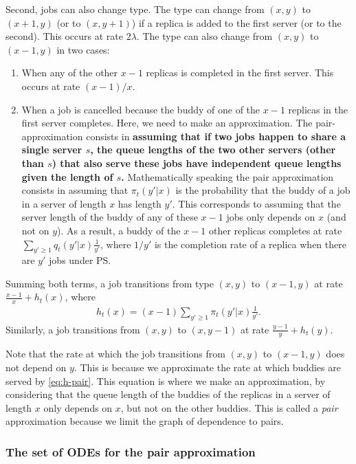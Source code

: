 \documentclass[acmsmall,nonacm]{acmart}
\begin{document}
Second, jobs can also change type.  The type can change from $(x,y)$ to $(x+1,y)$ (or to $(x,y+1)$) if a replica is added to the first server (or to the second). This occurs at rate $2\lambda$. The type can also change from $(x,y)$ to $(x-1,y)$ in two cases:
\begin{enumerate}
    \item When any of the other $x-1$ replicas is completed in the first server. This occurs at rate $(x-1)/x$. 
    \item When a job is cancelled because the buddy of one of the $x-1$ replicas in the first server completes. Here, we need 
    to make an approximation. The pair-approximation consists in {\bf assuming that if two jobs happen to share a single server $s$, 
     the queue lengths of the two other servers (other than $s$) that also serve these jobs have independent queue lengths given the length of $s$.}  Mathematically speaking the pair approximation consists in assuming that $\pi_t(y'|x)$ is the probability that the buddy of a job in a server of length $x$ has length $y'$.
     This corresponds to assuming that the server length of the buddy of any of these $x-1$ jobs only depends on $x$
     (and not on $y$).  
    As a result, a buddy of the $x-1$ other replicas completes at rate $\sum_{y' \geq 1}q_t(y'|x) \frac{1}{y'}$, where $1/y'$ is the completion rate of a replica when there are $y'$ jobs under PS.
\end{enumerate}
Summing both terms, a job transitions from type $(x,y)$ to $(x-1,y)$ at rate $\frac{x-1}{x} + h_t(x)$, where 
\begin{align}
    \label{eq:h-pair}
    h_t(x) = (x-1) \sum_{y' \geq 1} \pi_t(y'|x) \frac{1}{y'}.
\end{align}
Similarly, a job transitions from $(x,y)$ to $(x,y-1)$ at rate $\frac{y-1}{y} +h_t(y)$.


Note that the rate at which the job transitions from $(x,y)$ to $(x-1,y)$ does not depend on $y$. This is because we approximate the rate at which buddies are served by \eqref{eq:h-pair}. This equation is where we make an approximation, by considering that the queue length of the buddies of the replicas in a server of length $x$ only depends on $x$, but not on the other buddies. This is called a \emph{pair} approximation because we limit the graph of dependence to pairs.

\subsubsection{The set of ODEs for the pair approximation}
\end{document}
